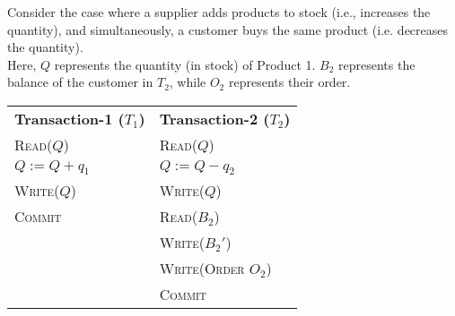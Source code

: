 Consider the case where a supplier adds products to stock (i.e., increases the quantity), and
simultaneously, a customer buys the same product (i.e. decreases the quantity). \\
Here, $Q$ represents the quantity (in stock) of Product 1. $B_{2}$ represents the balance of the customer in
$T_{2}$, while $O_{2}$ represents their order.

\begin{center}
    \begin{adjustbox}{width=\textwidth}
        \begin{tabularx}{\textwidth}{|X|X|}
        \hline
        \multirow{2}{*}{\textbf{Transaction-1 ($T_{1}$)}} & \multirow{2}{*}{\textbf{Transaction-2 ($T_{2}$)}} \\
        & \\ \hline
        \textsc{Read($Q$)} & \textsc{Read($Q$)} \\
        \textsc{$Q := Q + q_{1}$} & \textsc{$Q := Q - q_{2}$} \\
        \textsc{Write($Q$)} & \textsc{Write($Q$)} \\
        \textsc{Commit} & \textsc{Read($B_{2}$)} \\
        & \textsc{Write($B_{2}'$)} \\
        & \textsc{Write(Order $O_{2}$)} \\
        & \textsc{Commit} \\
        \hline
        \end{tabularx}
    \end{adjustbox}
\end{center}
\vspace*{5pt}